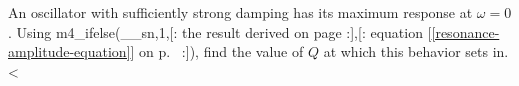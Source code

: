         An oscillator with sufficiently strong damping has its maximum response at
        $\omega=0$. Using
        m4_ifelse(__sn,1,[:%
        the result derived on page \pageref{misc:steadystate}
        :],[:%
        equation [\ref{resonance-amplitude-equation}] on p.~\pageref{resonance-amplitude-equation}
        :]),
        find the value of $Q$ at which this behavior sets in.
        <%
